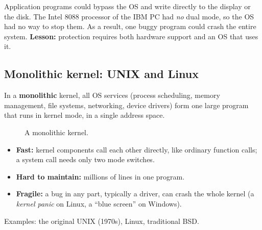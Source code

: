 \documentclass[11pt,a4paper]{article}
\newcommand{\term}[1]{\textbf{\color{mintdeep}#1}}
\begin{document}
Application programs could bypass the OS and write directly to the display or the disk. The Intel 8088 processor of the IBM PC had \emph{no} dual mode, so the OS had no way to stop them. As a result, one buggy program could crash the entire system. \textbf{Lesson:} protection requires both hardware support and an OS that uses it.

\subsection{Monolithic kernel: UNIX and Linux}

In a \term{monolithic} kernel, all OS services (process scheduling, memory management, file systems, networking, device drivers) form one large program that runs in kernel mode, in a single address space.

\begin{figure}[H]
\centering
{}
\caption{A monolithic kernel.}
\end{figure}

\begin{itemize}
  \item[\textcolor{mintdeep}{$+$}] \textbf{Fast:} kernel components call each other directly, like ordinary function calls; a system call needs only two mode switches.
  \item[\textcolor{red!60!black}{$-$}] \textbf{Hard to maintain:} millions of lines in one program.
  \item[\textcolor{red!60!black}{$-$}] \textbf{Fragile:} a bug in any part, typically a driver, can crash the whole kernel (a \emph{kernel panic} on Linux, a ``blue screen'' on Windows).
\end{itemize}
Examples: the original UNIX (1970s), Linux, traditional BSD.
\end{document}
